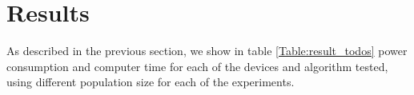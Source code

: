 \section{Results}
\label{results}

As described in the previous section, we show in table \ref{Table:result_todos} power consumption and computer time for each of the devices and algorithm tested, using different population size for each of the experiments.








